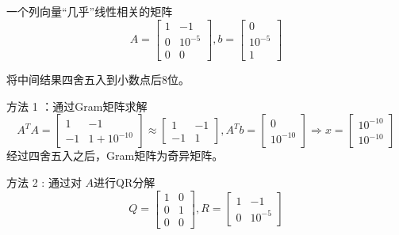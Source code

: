 \begin{example}
    一个列向量“几乎”线性相关的矩阵
\begin{equation}
A=\left[\begin{array}{cc}
1 & -1 \\
0 & 10^{-5} \\
0 & 0
\end{array}\right],  b=\left[\begin{array}{c}
0 \\
10^{-5} \\
1
\end{array}\right]
\end{equation}

将中间结果四舍五入到小数点后8位。

方法 1 ：通过Gram矩阵求解
\begin{equation}
A^{T} A=\left[\begin{array}{cc}
1 & -1 \\
-1 & 1+10^{-10}
\end{array}\right] \approx\left[\begin{array}{cc}
1 & -1 \\
-1 & 1
\end{array}\right], A^{T} b=\left[\begin{array}{c}
0 \\
10^{-10}
\end{array}\right] \Rightarrow x=\left[\begin{array}{c}
10^{-10} \\
10^{-10}
\end{array}\right]
\end{equation}
经过四舍五入之后，Gram矩阵为奇异矩阵。


方法 2 : 通过对 $A$进行QR分解
\begin{equation}
Q=\left[\begin{array}{ll}
1 & 0 \\
0 & 1 \\
0 & 0
\end{array}\right],  R=\left[\begin{array}{cc}
1 & -1 \\
0 & 10^{-5}
\end{array}\right]
\end{equation}


\end{example}
